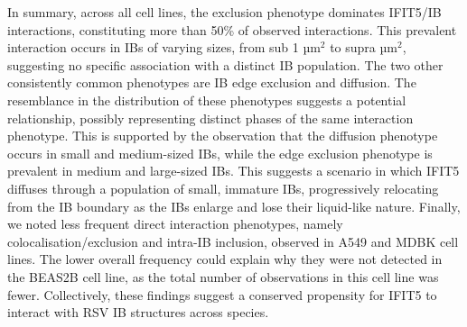 In summary, across all cell lines, the exclusion phenotype dominates IFIT5/IB interactions, constituting more than 50\% of observed interactions. This prevalent interaction occurs in IBs of varying sizes, from sub 1 \(\mbox{µm}^2\) to supra \(\mbox{µm}^2\), suggesting no specific association with a distinct IB population. The two other consistently common phenotypes are IB edge exclusion and diffusion. The resemblance in the distribution of these phenotypes suggests a potential relationship, possibly representing distinct phases of the same interaction phenotype. This is supported by the observation that the diffusion phenotype occurs in small and medium-sized IBs, while the edge exclusion phenotype is prevalent in medium and large-sized IBs. This suggests a scenario in which IFIT5 diffuses through a population of small, immature IBs, progressively relocating from the IB boundary as the IBs enlarge and lose their liquid-like nature. Finally, we noted less frequent direct interaction phenotypes, namely colocalisation/exclusion and intra-IB inclusion, observed in A549 and MDBK cell lines. The lower overall frequency could explain why they were not detected in the BEAS2B cell line, as the total number of observations in this cell line was fewer. Collectively, these findings suggest a conserved propensity for IFIT5 to interact with RSV IB structures across species.

